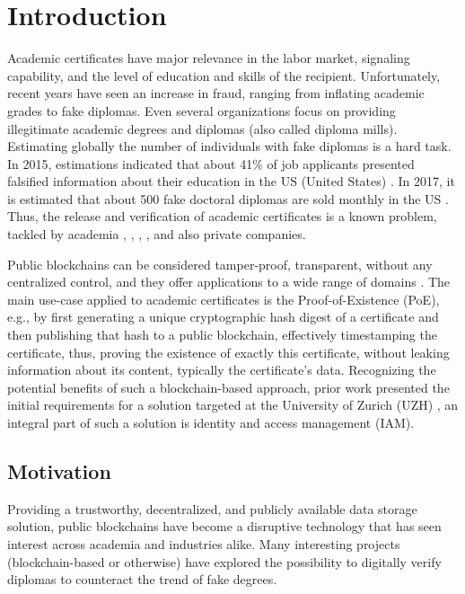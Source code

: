 \chapter{Introduction} \label{ch:introduction}

Academic certificates have major relevance in the labor market, signaling capability, and the level of education and skills of the recipient. Unfortunately, recent years have seen an increase in fraud, ranging from inflating academic grades to fake diplomas. Even several organizations focus on providing illegitimate academic degrees and diplomas (also called diploma mills). Estimating globally the number of individuals with fake diplomas is a hard task. In 2015, estimations indicated that about 41\% of job applicants presented falsified information
about their education in the US (United States) \cite{musee}. In 2017, it is estimated that about 500 fake doctoral diplomas are sold monthly in the US \cite{wicked-problem}. Thus, the release and verification of academic certificates is a known problem, tackled by academia \cite{educhain-proposal}, \cite{educhain-architecture}, \cite{mit-digital-diploma}, \cite{unic-certificates}, and also private
companies.

Public blockchains can be considered tamper-proof, transparent, without any centralized control, and they offer applications to a wide range of domains \cite{educhain-architecture}. The main use-case applied to academic certificates is the Proof-of-Existence (PoE), e.g., by first generating a unique cryptographic hash digest of a certificate and then publishing that hash to a public blockchain,
effectively timestamping the certificate, thus, proving the existence of exactly this certificate, without leaking information about its content, typically the certificate's data. Recognizing the potential benefits of such a blockchain-based approach, prior work presented the initial requirements for a solution targeted at the University of Zurich (UZH) \cite{educhain-architecture}, an integral part of such a solution is identity and access management (IAM). 

\section{Motivation}

Providing a trustworthy, decentralized, and publicly available data storage solution, public blockchains have
become a disruptive technology that has seen interest across academia and industries alike. Many
interesting projects (blockchain-based or otherwise) have explored the possibility to digitally verify diplomas
to counteract the trend of fake degrees.

